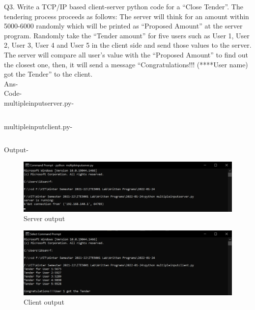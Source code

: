 \documentclass[12pt]{article}
\begin{document}
Q3. Write a TCP/IP based client-server python code for a “Close Tender”. The tendering process proceeds as follows: The server will think for an amount within 5000-6000 randomly which will be printed as “Proposed Amount” at the server program. Randomly take the “Tender amount” for five users such as User 1, User 2, User 3, User 4 and User 5 in the client side and send those values to the server. The server will compare all user’s value with the “Proposed Amount” to find out the closest one, then, it will send a message “Congratulations!!! (****User name) got the Tender” to the client.\\
Ans- \\ Code- \\ multipleinputserver.py-\inputminted{python}{multipleinputserver.py}
multipleinputclient.py- \inputminted{python}{multipleinputclient.py}
\newpage
Output-
\begin{figure}[h] %
\centering
\includegraphics[width=\textwidth]{multipleinputserver.png}
\caption{Server output}
\end{figure}
\begin{figure}[h] %
\centering
\includegraphics[width=\textwidth]{multipleinputclient.png}
\caption{Client output}
\end{figure}
\end{document}
